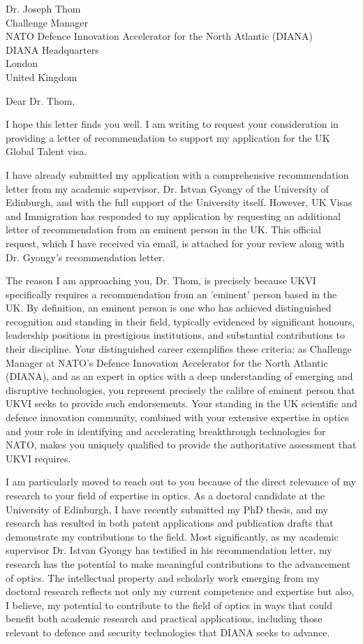 \documentclass[12pt,a4paper]{letter}
\begin{document}
\begin{letter}{Dr. Joseph Thom\\Challenge Manager\\NATO Defence Innovation Accelerator for the North Atlantic (DIANA)\\DIANA Headquarters\\London\\United Kingdom}

\date{\today}

\opening{Dear Dr. Thom,}

I hope this letter finds you well. I am writing to request your consideration in providing a letter of recommendation to support my application for the UK Global Talent visa.

I have already submitted my application with a comprehensive recommendation letter from my academic supervisor, Dr. Istvan Gyongy of the University of Edinburgh, and with the full support of the University itself. However, UK Visas and Immigration has responded to my application by requesting an additional letter of recommendation from an eminent person in the UK. This official request, which I have received via email, is attached for your review along with Dr. Gyongy's recommendation letter.

The reason I am approaching you, Dr. Thom, is precisely because UKVI specifically requires a recommendation from an 'eminent' person based in the UK. By definition, an eminent person is one who has achieved distinguished recognition and standing in their field, typically evidenced by significant honours, leadership positions in prestigious institutions, and substantial contributions to their discipline. Your distinguished career exemplifies these criteria: as Challenge Manager at NATO's Defence Innovation Accelerator for the North Atlantic (DIANA), and as an expert in optics with a deep understanding of emerging and disruptive technologies, you represent precisely the calibre of eminent person that UKVI seeks to provide such endorsements. Your standing in the UK scientific and defence innovation community, combined with your extensive expertise in optics and your role in identifying and accelerating breakthrough technologies for NATO, makes you uniquely qualified to provide the authoritative assessment that UKVI requires.

I am particularly moved to reach out to you because of the direct relevance of my research to your field of expertise in optics. As a doctoral candidate at the University of Edinburgh, I have recently submitted my PhD thesis, and my research has resulted in both patent applications and publication drafts that demonstrate my contributions to the field. Most significantly, as my academic supervisor Dr. Istvan Gyongy has testified in his recommendation letter, my research has the potential to make meaningful contributions to the advancement of optics. The intellectual property and scholarly work emerging from my doctoral research reflects not only my current competence and expertise but also, I believe, my potential to contribute to the field of optics in ways that could benefit both academic research and practical applications, including those relevant to defence and security technologies that DIANA seeks to advance.


\end{letter}
\end{document}
